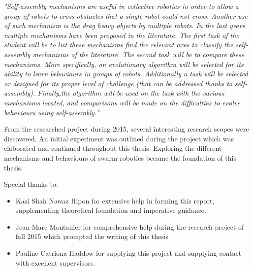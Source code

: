 \documentclass[a4paper,12pt,twoside,openright]{book}
\begin{document}
\begin{center}

\textit{"Self-assembly mechanisms are useful in collective robotics in order to allow a group of robots to cross obstacles that a single robot could not cross. Another use of such mechanism is the drag heavy objects by multiple robots. In the last years multiple mechanisms have been proposed in the literature. The first task of the student will be to list these mechanisms find the relevant axes to classify the self-assembly mechanisms of the literature. The second task will be to compare these mechanisms. More specifically, an evolutionary algorithm will be selected for its ability to learn behaviours in groups of robots. Additionally a task will be selected or designed for its proper level of challenge (that can be addressed thanks to self-assembly). Finally,the algorithm will be used on the task with the various mechanisms located, and comparisons will be made on the difficulties to evolve behaviours using self-assembly."\\}

\end{center}

From the researched project during 2015, several interesting research scopes were discovered.
An initial experiment was outlined during the project which was elaborated and continued throughout this thesis.
Exploring the different mechanisms and behaviours of swarm-robotics became the foundation of this thesis.

Special thanks to:

\begin{itemize}

\item Kazi Shah Nawaz Ripon for extensive help in forming this report, supplementing theoretical foundation and imperative guidance.

\item Jean-Marc Montanier for comprehensive help during the research project of fall 2015 which prompted the writing of this thesis

\item Pauline Catriona Haddow for supplying this project and supplying contact with excellent supervisors.

\end{itemize}

\tableofcontents

\newpage
\listoffigures
\newpage
\listoftables

\mainmatter
\pagestyle{main}
\end{document}
